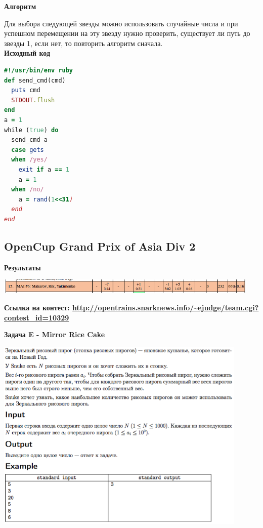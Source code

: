 \documentclass[a4paper,12pt]{article}
\begin{document}
\textbf{{\large Алгоритм}}

Для выбора следующей звезды можно использовать случайные числа и при успешном перемещении на эту звезду нужно проверить, существует ли путь до звезды 1, если нет, то повторить алгоритм сначала. \\

\newpage
\textbf{{\large Исходный код}} \\
\begin{lstlisting}[language=Ruby]
#!/usr/bin/env ruby
def send_cmd(cmd)
  puts cmd
  STDOUT.flush
end
a = 1
while (true) do
  send_cmd a
  case gets
  when /yes/
    exit if a == 1
    a = 1
  when /no/
    a = rand(1<<31)
  end
end

\end{lstlisting}






%
%
\newpage
\subsection{OpenCup Grand Prix of Asia Div 2}

\textbf{{\large Результаты}} \\
\begin{center}
\includegraphics[width=0.95\textwidth]{OC_Asia/result.png}\\ [1cm]
\end{center}

\textbf{{\large Ссылка на контест: \url{http://opentrains.snarknews.info/~ejudge/team.cgi?contest_id=10329}}}

\newpage
\textbf{{\large Задача E - Mirror Rice Cake}}

\begin{center}
\includegraphics[width=0.9\textwidth]{OC_Asia/E.png}\\ [1cm]
\end{center}
\end{document}
